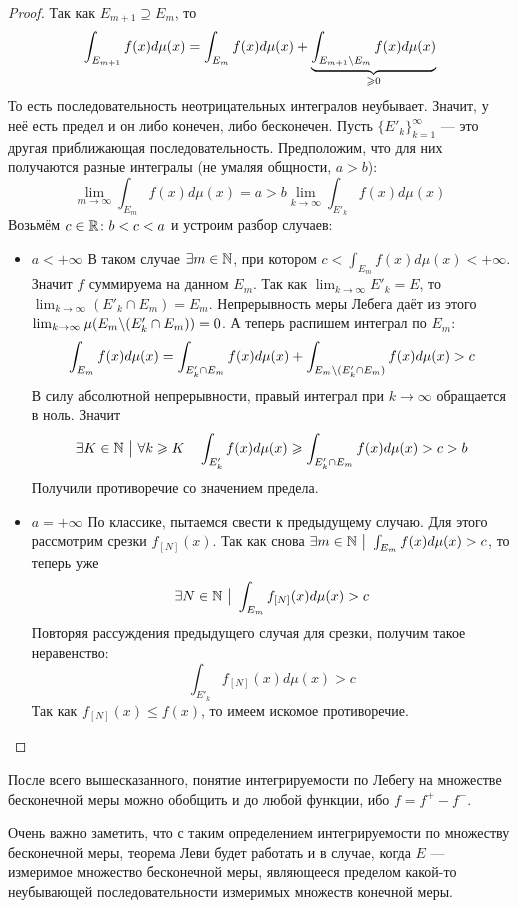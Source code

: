 \begin{proof}
	Так как $E_{m + 1} \supseteq E_m$, то
	\[
		\int_{E_{m + 1}} f(x)d\mu(x) = \int_{E_m} f(x)d\mu(x) + \underbrace{\int_{E_{m + 1} \backslash E_m} f(x)d\mu(x)}_{\geqslant 0}
	\]
	То есть последовательность неотрицательных интегралов неубывает. Значит, у неё есть предел и он либо конечен, либо бесконечен. Пусть $\{E'_k\}_{k = 1}^\infty$ --- это другая приближающая последовательность. Предположим, что для них получаются разные интегралы (не умаляя общности, $a > b$):
	\[
		\lim_{m \to \infty} \int_{E_m} f(x)d\mu(x) = a > b \lim_{k \to \infty} \int_{E'_k} f(x)d\mu(x)
	\]
	Возьмём $c \in \mathbb{R} \colon b < c < a$ и устроим разбор случаев:
	\begin{itemize}
		\item $a < +\infty$ В таком случае $\exists m \in \mathbb{N}$, при котором $c < \int_{E_m} f(x)d\mu(x) < +\infty$. Значит $f$ суммируема на данном $E_m$. Так как $\lim_{k \to \infty} E'_k = E$, то $\lim_{k \to \infty} (E'_k \cap E_m) = E_m$. Непрерывность меры Лебега даёт из этого $\lim_{k \to \infty} \mu(E_m \backslash (E'_k \cap E_m)) = 0$. А теперь распишем интеграл по $E_m$:
		\[
			\int_{E_m} f(x)d\mu(x) = \int_{E'_k \cap E_m} f(x)d\mu(x) + \int_{E_m \backslash (E'_k \cap E_m)} f(x)d\mu(x) > c
		\]
		В силу абсолютной непрерывности, правый интеграл при $k \to \infty$ обращается в ноль. Значит
		\[
			\exists K \in \mathbb{N} \ \big|\  \forall k \geqslant K \quad \int_{E'_k} f(x)d\mu(x) \geqslant \int_{E'_k \cap E_m} f(x)d\mu(x) > c > b
		\]
		Получили противоречие со значением предела.
		
		\item $a = +\infty$ По классике, пытаемся свести к предыдущему случаю. Для этого рассмотрим срезки $f_{[N]}(x)$. Так как снова $\exists m \in \mathbb{N} \ \big|\  \int_{E_m} f(x)d\mu(x) > c$, то теперь уже
		\[
			\exists N \in \mathbb{N} \ \big|\  \int_{E_m} f_{[N]}(x)d\mu(x) > c
		\]
		Повторяя рассуждения предыдущего случая для срезки, получим такое неравенство:
		\[
			\int_{E'_k} f_{[N]}(x)d\mu(x) > c
		\]
		Так как $f_{[N]}(x) \le f(x)$, то имеем искомое противоречие.
	\end{itemize}
\end{proof}

\begin{note}
	После всего вышесказанного, понятие интегрируемости по Лебегу на множестве бесконечной меры можно обобщить и до любой функции, ибо $f = f^+ - f^-$.
\end{note}

\begin{note}
	Очень важно заметить, что с таким определением интегрируемости по множеству бесконечной меры, теорема Леви будет работать и в случае, когда $E$ --- измеримое множество бесконечной меры, являющееся пределом какой-то неубывающей последовательности измеримых множеств конечной меры.
\end{note}